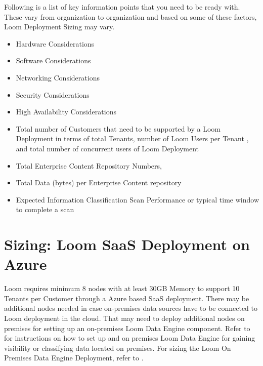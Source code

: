 \documentclass[letterpaper,10pt,english]{sphinxmanual}
\begin{document}
Following is a list of key information points that you need to be ready with.  These vary from organization to organization and based on some of these factors, Loom Deployment Sizing may vary.
\begin{itemize}
\item {} 
Hardware Considerations

\item {} 
Software Considerations

\item {} 
Networking Considerations

\item {} 
Security Considerations

\item {} 
High Availability Considerations

\item {} 
Total number of Customers that need to be supported by a Loom Deployment in terms of total Tenants, number of Loom Users per Tenant , and total number of concurrent users of Loom Deployment

\item {} 
Total Enterprise Content Repository Numbers,

\item {} 
Total Data (bytes) per Enterprise Content repository

\item {} 
Expected Information Classification Scan Performance or typical time window to complete a scan

\end{itemize}


\section{Sizing: Loom SaaS Deployment on Azure}
\label{\detokenize{loom_trbs_faq:sizing-loom-saas-azure}}\label{\detokenize{loom_trbs_faq:sizing-loom-saas-deployment-on-azure}}
Loom requires minimum 8 nodes with at least 30GB Memory to support 10 Tenants per Customer through a Azure based SaaS deployment. There may be additional nodes needed in case on-premises data sources have to be connected to Loom deployment in the cloud. That may need to deploy additional nodes on premises for setting up an on-premises Loom Data Engine component. Refer to  for instructions on how to set up and on premises Loom Data Engine for gaining visibility or classifying data located on premises. For sizing the Loom On Premises Data Engine Deployment, refer to {\hyperref[\detokenize{loom_trbs_faq:ht-loom-op-de-sizing}]{}}.
\end{document}

